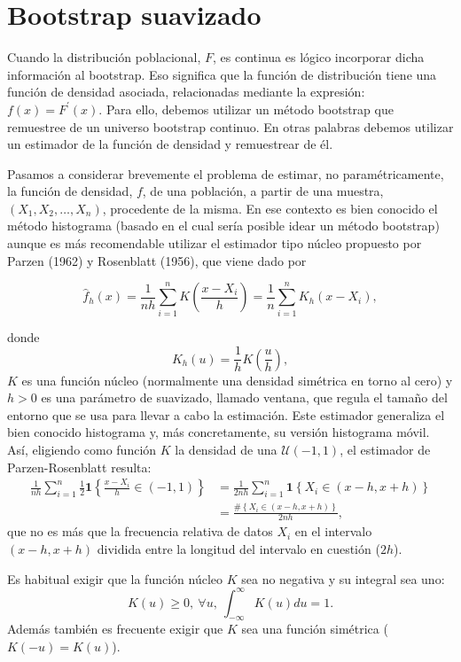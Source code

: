\documentclass[]{book}
\theoremstyle{definition}
\theoremstyle{definition}
\theoremstyle{definition}
\theoremstyle{remark}
\begin{document}
\section{Bootstrap suavizado}\label{cap4-boot-suav}

Cuando la distribución poblacional, \(F\), es continua es lógico
incorporar dicha información al bootstrap. Eso significa que la función
de distribución tiene una función de densidad asociada, relacionadas
mediante la expresión:
\(f\left( x \right) =F^{\prime}\left( x \right)\). Para ello, debemos
utilizar un método bootstrap que remuestree de un universo bootstrap
continuo. En otras palabras debemos utilizar un estimador de la función
de densidad y remuestrear de él.

Pasamos a considerar brevemente el problema de estimar, no
paramétricamente, la función de densidad, \(f\), de una población, a
partir de una muestra, \(\left( X_1,X_2,\ldots ,X_n \right)\),
procedente de la misma. En ese contexto es bien conocido el método
histograma (basado en el cual sería posible idear un método bootstrap)
aunque es más recomendable utilizar el estimador tipo núcleo propuesto
por Parzen (1962) y Rosenblatt (1956), que viene dado por

\[\hat{f}_{h}\left( x \right) =\frac{1}{nh}\sum_{i=1}^{n}K\left( \frac{x-X_i}{
h} \right) =\frac{1}{n}\sum_{i=1}^{n}K_{h}\left( x-X_i \right),\]

donde \[K_{h}\left( u \right) =\frac{1}{h}K\left( \frac{u}{h} \right),\]
\(K\) es una función núcleo (normalmente una densidad simétrica en torno
al cero) y \(h>0\) es una parámetro de suavizado, llamado ventana, que
regula el tamaño del entorno que se usa para llevar a cabo la
estimación. Este estimador generaliza el bien conocido histograma y, más
concretamente, su versión histograma móvil. Así, eligiendo como función
\(K\) la densidad de una \(\mathcal{U}\left( -1,1 \right)\), el
estimador de Parzen-Rosenblatt resulta: \[\begin{aligned}
\frac{1}{nh}\sum_{i=1}^{n}\frac{1}{2}\mathbf{1}\left\{ \frac{x-X_i}{h}\in
\left( -1,1 \right) \right\} &= \frac{1}{2nh}\sum_{i=1}^{n}\mathbf{1}\left\{
X_i\in \left( x-h,x+h \right) \right\} \\
&= \frac{\#\left\{ X_i\in \left( x-h,x+h \right) \right\} }{2nh},
\end{aligned}\] que no es más que la frecuencia relativa de datos
\(X_i\) en el intervalo \(\left( x-h,x+h \right)\) dividida entre la
longitud del intervalo en cuestión (\(2h\)).

Es habitual exigir que la función núcleo \(K\) sea no negativa y su
integral sea uno:
\[K\left( u \right) \geq 0,~\forall u,~\int_{-\infty }^{\infty }K\left(u \right) du=1.\]
Además también es frecuente exigir que \(K\) sea una función simétrica
(\(K\left( -u \right) =K\left( u \right)\)).
\end{document}

